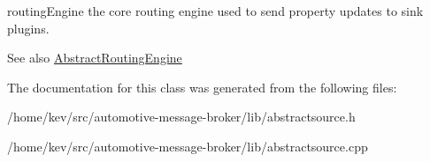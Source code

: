 routing\+Engine the core routing engine used to send property updates to sink plugins. 

\begin{DoxySeeAlso}{See also}
\hyperlink{classAbstractRoutingEngine}{Abstract\+Routing\+Engine} 
\end{DoxySeeAlso}


The documentation for this class was generated from the following files\+:\begin{DoxyCompactItemize}
\item 
/home/kev/src/automotive-\/message-\/broker/lib/abstractsource.\+h\item 
/home/kev/src/automotive-\/message-\/broker/lib/abstractsource.\+cpp\end{DoxyCompactItemize}
